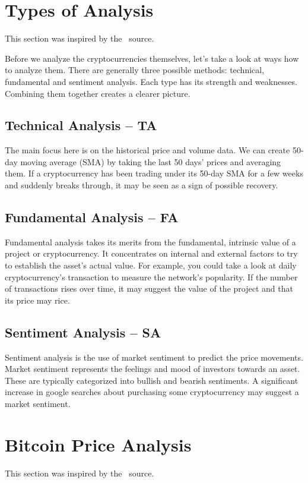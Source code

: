 \section{Types of Analysis}
This section was inspired by the~\cite{binance:bitcoin-price-history} source.

Before we analyze the cryptocurrencies themselves, let's take a look at ways how to analyze them. There are generally three possible methods: technical, fundamental and sentiment analysis. Each type has its strength and weaknesses. Combining them together creates a clearer picture.

\subsection*{Technical Analysis -- TA}
The main focus here is on the historical price and volume data. We can create 50-day moving average (SMA) by taking the last 50 days' prices and averaging them. If a cryptocurrency has been trading under its 50-day SMA for a few weeks and suddenly breaks through, it may be seen as a sign of possible recovery.

\subsection*{Fundamental Analysis -- FA}
Fundamental analysis takes its merits from the fundamental, intrinsic value of a project or cryptocurrency. It concentrates on internal and external factors to try to establish the asset's actual value. For example, you could take a look at daily cryptocurrency's transaction to measure the network's popularity. If the number of transactions rises over time, it may suggest the value of the project and that its price may rice.

\subsection*{Sentiment Analysis -- SA}
Sentiment analysis is the use of market sentiment to predict the price movements. Market sentiment represents the feelings and mood of investors towards an asset. These are typically categorized into bullish and bearish sentiments. A significant increase in google searches about purchasing some cryptocurrency may suggest a market sentiment.

\section{Bitcoin Price Analysis}
This section was inspired by the~\cite{binance:bitcoin-price-history} source.

